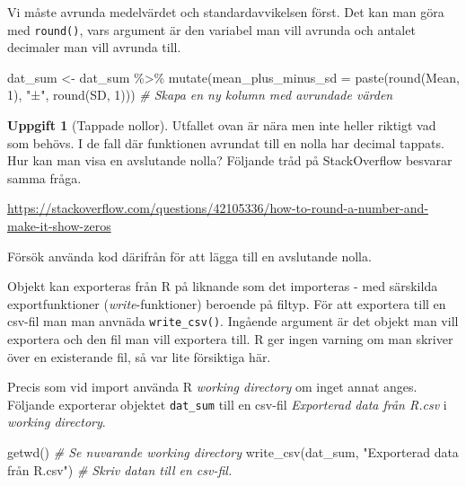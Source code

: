\documentclass[
]{book}
\newenvironment{Shaded}{\begin{snugshade}}{\end{snugshade}}
\newcommand{\AttributeTok}[1]{\textcolor[rgb]{0.77,0.63,0.00}{#1}}
\newcommand{\CommentTok}[1]{\textcolor[rgb]{0.56,0.35,0.01}{\textit{#1}}}
\newcommand{\DecValTok}[1]{\textcolor[rgb]{0.00,0.00,0.81}{#1}}
\newcommand{\FunctionTok}[1]{\textcolor[rgb]{0.00,0.00,0.00}{#1}}
\newcommand{\NormalTok}[1]{#1}
\newcommand{\OtherTok}[1]{\textcolor[rgb]{0.56,0.35,0.01}{#1}}
\newcommand{\SpecialCharTok}[1]{\textcolor[rgb]{0.00,0.00,0.00}{#1}}
\newcommand{\StringTok}[1]{\textcolor[rgb]{0.31,0.60,0.02}{#1}}
\theoremstyle{definition}
\theoremstyle{definition}
\theoremstyle{definition}
\newtheorem{exercise}{Uppgift}[chapter]
\theoremstyle{definition}
\theoremstyle{remark}
\begin{document}
Vi måste avrunda medelvärdet och standardavvikelsen först. Det kan man göra med \texttt{round()}, vars argument är den variabel man vill avrunda och antalet decimaler man vill avrunda till.

\begin{Shaded}
\begin{Highlighting}[]
\NormalTok{dat\_sum }\OtherTok{\textless{}{-}}\NormalTok{ dat\_sum }\SpecialCharTok{\%\textgreater{}\%} 
  \FunctionTok{mutate}\NormalTok{(}\AttributeTok{mean\_plus\_minus\_sd =} \FunctionTok{paste}\NormalTok{(}\FunctionTok{round}\NormalTok{(Mean, }\DecValTok{1}\NormalTok{), }\StringTok{"±"}\NormalTok{, }\FunctionTok{round}\NormalTok{(SD, }\DecValTok{1}\NormalTok{)))        }\CommentTok{\# Skapa en ny kolumn med avrundade värden}
\end{Highlighting}
\end{Shaded}

\begin{exercise}[Tappade nollor]
Utfallet ovan är nära men inte heller riktigt vad som behövs. I de fall där funktionen avrundat till en nolla har decimal tappats. Hur kan man visa en avslutande nolla? Följande tråd på StackOverflow besvarar samma fråga.

\url{https://stackoverflow.com/questions/42105336/how-to-round-a-number-and-make-it-show-zeros}

Försök använda kod därifrån för att lägga till en avslutande nolla.
\end{exercise}

Objekt kan exporteras från R på liknande som det importeras - med särskilda exportfunktioner (\emph{write}-funktioner) beroende på filtyp. För att exportera till en csv-fil man man anvnäda \texttt{write\_csv()}. Ingående argument är det objekt man vill exportera och den fil man vill exportera till. R ger ingen varning om man skriver över en existerande fil, så var lite försiktiga här.

Precis som vid import använda R \emph{working directory} om inget annat anges. Följande exporterar objektet \texttt{dat\_sum} till en csv-fil \emph{Exporterad data från R.csv} i \emph{working directory}.

\begin{Shaded}
\begin{Highlighting}[]
\FunctionTok{getwd}\NormalTok{()                                                    }\CommentTok{\# Se nuvarande working directory}
\FunctionTok{write\_csv}\NormalTok{(dat\_sum, }\StringTok{"Exporterad data från R.csv"}\NormalTok{)           }\CommentTok{\# Skriv datan till en csv{-}fil.}
\end{Highlighting}
\end{Shaded}
\end{document}
